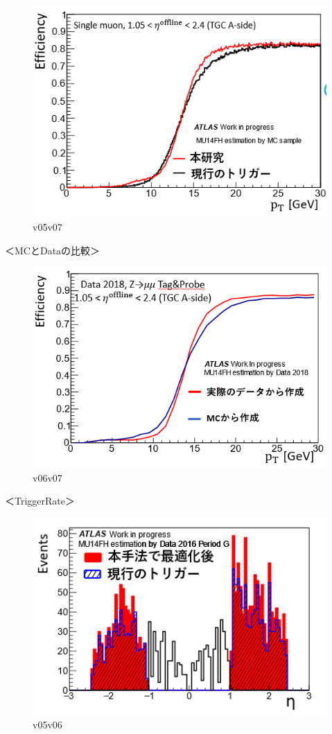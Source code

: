 \begin{figure}[tb]
  \centering
  \includegraphics[clip, width=14cm]{fig/4/hikaku_v05_v07.png}
  \caption{v05v07}
  \label{fig:Resolution}
\end{figure}

＜MCとDataの比較＞
\begin{figure}[tb]
  \centering
  \includegraphics[clip, width=14cm]{fig/4/hikaku_v06_v07.png}
  \caption{v06v07}
  \label{fig:Resolution}
\end{figure}

＜TriggerRate＞
\begin{figure}[tb]
  \centering
  \includegraphics[clip, width=14cm]{fig/4/rate_v05_v06.png}
  \caption{v05v06}
  \label{fig:Resolution}
\end{figure}

